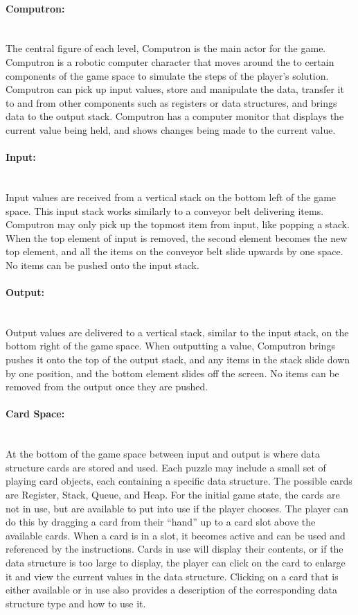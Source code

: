 	\paragraph{Computron:} ~\\
	The central figure of each level, Computron is the main actor for the game.
	Computron is a robotic computer character that moves around the to certain components of the game space to simulate the steps of the player's solution.
	Computron can pick up input values, store and manipulate the data, transfer it to and from other components such as registers or data structures, and brings data to the output stack.
	Computron has a computer monitor that displays the current value being held, and shows changes being made to the current value.

	\paragraph{Input:} ~\\
	Input values are received from a vertical stack on the bottom left of the game space. This input stack works similarly to a conveyor belt delivering items. Computron may only pick up the topmost item from input, like popping a stack. When the top element of input is removed, the second element becomes the new top element, and all the items on the conveyor belt slide upwards by one space.
	No items can be pushed onto the input stack.

	\paragraph{Output:} ~\\
	Output values are delivered to a vertical stack, similar to the input stack, on the bottom right of the game space. When outputting a value, Computron brings pushes it onto the top of the output stack, and any items in the stack slide down by one position, and the bottom element slides off the screen.
	No items can be removed from the output once they are pushed.


	\paragraph{Card Space:} ~\\
	At the bottom of the game space between input and output is where data structure cards are stored and used.
	Each puzzle may include a small set of playing card objects, each containing a specific data structure. The possible cards are Register, Stack, Queue, and Heap. For the initial game state, the cards are not in use, but are available to put into use if the player chooses. The player can do this by dragging a card from their ``hand'' up to a card slot above the available cards. When a card is in a slot, it becomes active and can be used and referenced by the instructions.
	Cards in use will display their contents, or if the data structure is too large to display, the player can click on the card  to enlarge it and view the current values in the data structure.
	Clicking on a card that is either available or in use also provides a description of the corresponding data structure type and how to use it.

